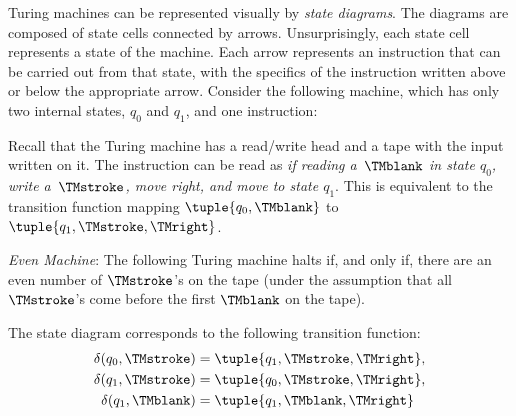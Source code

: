 \documentclass[../../../include/open-logic-section]{subfiles}
\begin{document}

\begin{explain}
Turing machines can be represented visually by \emph{state diagrams}. 
The diagrams are composed of
state cells connected by arrows. Unsurprisingly, each state cell represents
a state of the machine. Each arrow represents an instruction that can be
carried out from that state, with the specifics of the instruction written above
or below the appropriate arrow. Consider the following machine, which has 
only two internal states, $q_0$ and $q_1$, and one instruction:
\begin{center}
\end{center}
Recall that the Turing machine has a read/write head and a tape with
the input written on it. The instruction can be read as \emph{if
reading a~$\TMblank$ in state $q_0$, write a~$\TMstroke$, move right,
and move to state $q_1$}. This is equivalent to the transition
function mapping $\tuple{q_0, \TMblank}$ to $\tuple{q_1, \TMstroke,
\TMright}$.
\end{explain}

\begin{ex}
\emph{Even Machine}: The following Turing machine halts if, and only
if, there are an even number of $\TMstroke$'s on the tape (under the
assumption that all $\TMstroke$'s come before the first $\TMblank$ on
the tape).
\begin{center}
\end{center}
The state diagram corresponds to the following transition function:
\begin{align*}
\delta(q_0, \TMstroke) & = \tuple{q_1, \TMstroke, \TMright},\\
\delta(q_1, \TMstroke) & = \tuple{q_0, \TMstroke, \TMright},\\
\delta(q_1, \TMblank)  & = \tuple{q_1, \TMblank, \TMright}
\end{align*}
\end{ex}
\end{document}
